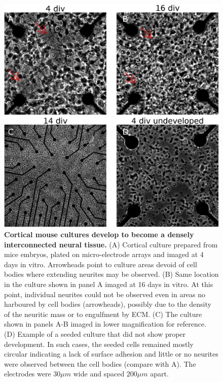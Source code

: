        \begin{figure}[!htb]
            \centering
            \includegraphics[width=15cm]{chapter3/figures/mouseImages/mouseImages.jpg}

            \caption[Representative images of a cortical mouse culture developing on a planar multi electrode array]{\textbf{Cortical mouse cultures develop to become a densely interconnected neural tissue.} (A) Cortical culture prepared from mice embryos, plated on micro-electrode arrays and imaged at 4 days in vitro. Arrowheads point to culture areas devoid of cell bodies where extending neurites may be observed. (B) Same location in the culture shown in panel A imaged at 16 days in vitro. At this point, individual neurites could not be observed even in areas no harboured by cell bodies (arrowheads), possibly due to the density of the neuritic mass or to engulfment by ECM. (C) The culture shown in panels A-B imaged in lower magnification for reference. (D) Example of a seeded culture that did not show proper development. In such cases, the seeded cells remained mostly circular indicating a lack of surface adhesion and little or no neurites were observed between the cell bodies (compare with A). The electrodes were \(30 \mu m\) wide and spaced \(200 \mu m\) apart.}
            \label{fig:activity:mouseImages}
        \end{figure}




